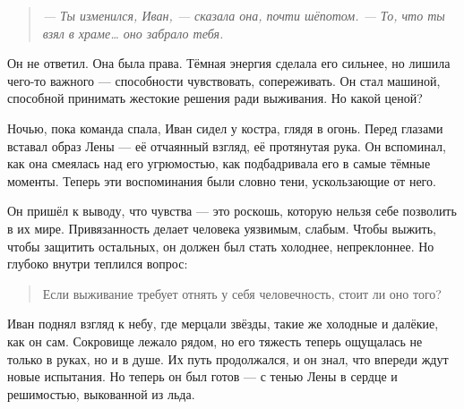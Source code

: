 \documentclass[12pt,a4paper]{book} %
\newenvironment{dialogue}{\begin{quote}\itshape}{\end{quote}}
\begin{document}
\begin{dialogue}
--- Ты изменился, Иван, --- сказала она, почти шёпотом. --- То, что ты взял в храме… оно забрало тебя.
\end{dialogue}

Он не ответил. Она была права. Тёмная энергия сделала его сильнее, но лишила чего-то важного --- способности чувствовать, сопереживать. Он стал машиной, способной принимать жестокие решения ради выживания. Но какой ценой?

Ночью, пока команда спала, Иван сидел у костра, глядя в огонь. Перед глазами вставал образ Лены --- её отчаянный взгляд, её протянутая рука. Он вспоминал, как она смеялась над его угрюмостью, как подбадривала его в самые тёмные моменты. Теперь эти воспоминания были словно тени, ускользающие от него.

Он пришёл к выводу, что чувства --- это роскошь, которую нельзя себе позволить в их мире. Привязанность делает человека уязвимым, слабым. Чтобы выжить, чтобы защитить остальных, он должен был стать холоднее, непреклоннее. Но глубоко внутри теплился вопрос:

\begin{quote}
Если выживание требует отнять у себя человечность, стоит ли оно того?
\end{quote}

Иван поднял взгляд к небу, где мерцали звёзды, такие же холодные и далёкие, как он сам. Сокровище лежало рядом, но его тяжесть теперь ощущалась не только в руках, но и в душе. Их путь продолжался, и он знал, что впереди ждут новые испытания. Но теперь он был готов --- с тенью Лены в сердце и решимостью, выкованной из льда.
\end{document}
